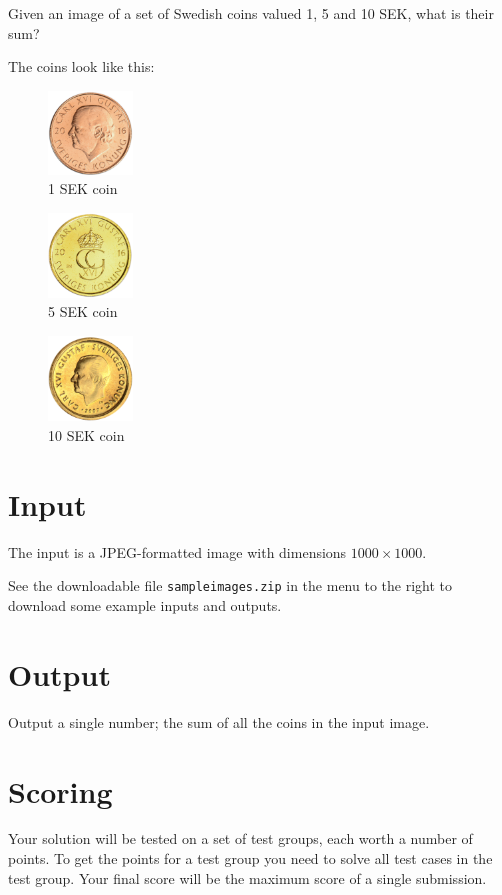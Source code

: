 Given an image of a set of Swedish coins valued 1, 5 and 10 SEK, what is their sum?

The coins look like this:
\begin{figure}[h]
  \centering
  \includegraphics[width=0.2\textwidth]{1.png}
  \caption{1 SEK coin}
\end{figure}
\begin{figure}[h]
  \centering
  \includegraphics[width=0.2\textwidth]{5.png}
  \caption{5 SEK coin}
\end{figure}
\begin{figure}[h]
  \centering
  \includegraphics[width=0.2\textwidth]{10.png}
  \caption{10 SEK coin}
\end{figure}

\section*{Input}
The input is a JPEG-formatted image with dimensions $1000 \times 1000$.

See the downloadable file \texttt{sampleimages.zip} in the menu to the right to download some example inputs and outputs.

\section*{Output}
Output a single number; the sum of all the coins in the input image.

\section*{Scoring}
Your solution will be tested on a set of test groups, each worth a number of points.
To get the points for a test group you need to solve all test cases in the test group.
Your final score will be the maximum score of a single submission.

